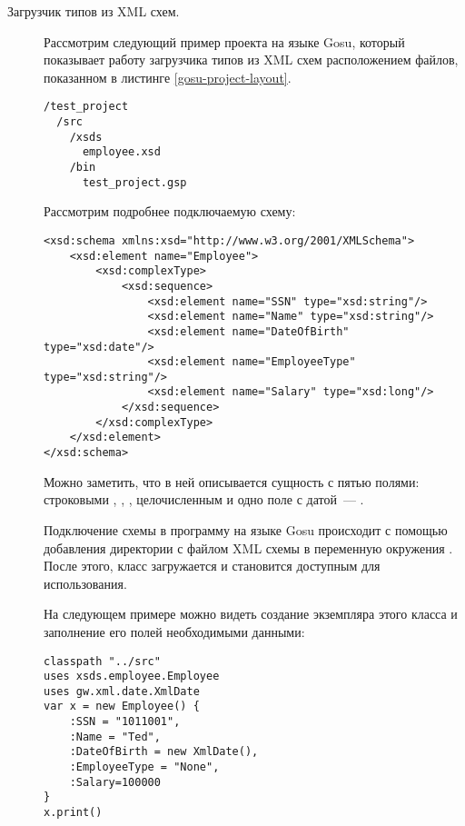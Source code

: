 \begin{description}
\item[Загрузчик типов из XML схем.] Рассмотрим следующий пример проекта на языке Gosu, который показывает работу загрузчика типов из XML схем расположением файлов, показанном в листинге \ref{gosu-project-layout}.

\begin{code}\begin{lstlisting}[caption={Расположение файлов в примере загрузчиков типов на языке Gosu, использующее загрузку типов из XML схем.}, label=gosu-project-layout]
/test_project
  /src
    /xsds
      employee.xsd
    /bin
      test_project.gsp
\end{lstlisting}\end{code}

\begin{code}
Рассмотрим подробнее подключаемую схему:
\begin{lstlisting}[caption={Содержимое файла \texttt{employee.xsd} из примера~\ref{gosu-project-layout}.}, label=gosu-employee-xsd]
<xsd:schema xmlns:xsd="http://www.w3.org/2001/XMLSchema">
    <xsd:element name="Employee">
        <xsd:complexType>
            <xsd:sequence>
                <xsd:element name="SSN" type="xsd:string"/>
                <xsd:element name="Name" type="xsd:string"/>
                <xsd:element name="DateOfBirth" type="xsd:date"/>
                <xsd:element name="EmployeeType" type="xsd:string"/>
                <xsd:element name="Salary" type="xsd:long"/>
            </xsd:sequence>
        </xsd:complexType>
    </xsd:element>
</xsd:schema>
\end{lstlisting}\end{code}

Можно заметить, что в ней описывается сущность  с пятью полями: строковыми
, , , целочисленным 
и одно поле с датой~--- .

Подключение схемы в программу на языке Gosu происходит с помощью добавления директории с файлом XML схемы в переменную окружения .
После этого, класс  загружается и становится доступным для использования.

На следующем примере можно видеть создание экземпляра этого класса и заполнение его полей необходимыми данными:

\begin{code}\begin{lstlisting}[caption={Содержимое файла \texttt{test\_project.gsp} из примера~\ref{gosu-project-layout}.}, label=gosu-xsd-loader]
classpath "../src"
uses xsds.employee.Employee
uses gw.xml.date.XmlDate
var x = new Employee() {
    :SSN = "1011001",
    :Name = "Ted",
    :DateOfBirth = new XmlDate(),
    :EmployeeType = "None",
    :Salary=100000
}
x.print()
\end{lstlisting}


\end{code}
\end{description}
